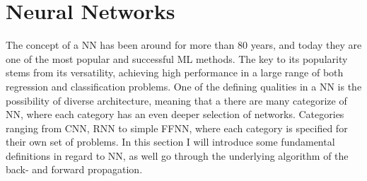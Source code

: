 \section{Neural Networks}\label{sec:NN}
The concept of a \ac{NN} has been around for more than 80 years, and today they are one 
of the most popular and successful \ac{ML} methods. The key to its popularity stems from
its versatility, achieving high performance in a large range of both regression 
and classification problems. One of the defining qualities in a \ac{NN} is the 
possibility of diverse architecture, meaning that a there are many
categorize of \ac{NN}, where each category has an even deeper selection of
networks. Categories ranging from \ac{CNN}, \ac{RNN} to simple \ac{FFNN}, where each
category is specified for their own set of problems. In this section I will introduce 
some fundamental definitions in regard to \ac{NN}, as well go through the underlying 
algorithm of the back- and forward propagation.

